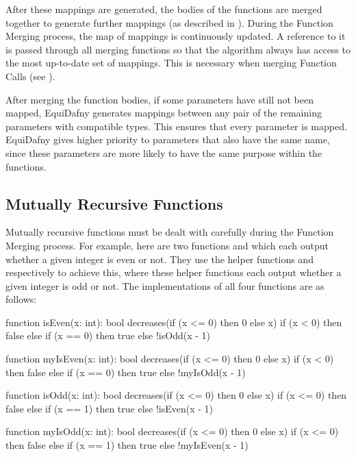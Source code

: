 After these mappings are generated, the bodies of the functions are merged together to generate further mappings (as described in ). During the Function Merging process, the map of mappings is continuously updated. A reference to it is passed through all merging functions so that the algorithm always has access to the most up-to-date set of mappings. This is necessary when merging Function Calls (see ). 

After merging the function bodies, if some parameters have still not been mapped, EquiDafny generates mappings between any pair of the remaining parameters with compatible types. This ensures that every parameter is mapped. EquiDafny gives higher priority to parameters that also have the same name, since these parameters are more likely to have the same purpose within the functions.

\subsection{Mutually Recursive Functions}\label{sec:mutually-recursive}
Mutually recursive functions must be dealt with carefully during the Function Merging process. For example, here are two functions  and  which each output whether a given integer is even or not. They use the helper functions  and  respectively to achieve this, where these helper functions each output whether a given integer is odd or not. The implementations of all four functions are as follows:

\begin{dafny}[highlightlines={5,12,19,26}]
function isEven(x: int): bool
  decreases(if (x <= 0) then 0 else x) {
  if (x < 0) then false
  else if (x == 0) then true
  else !isOdd(x - 1)
}

function myIsEven(x: int): bool
  decreases(if (x <= 0) then 0 else x) {
  if (x < 0) then false
  else if (x == 0) then true
  else !myIsOdd(x - 1)
}

function isOdd(x: int): bool
  decreases(if (x <= 0) then 0 else x) {
  if (x <= 0) then false
  else if (x == 1) then true
  else !isEven(x - 1)
}

function myIsOdd(x: int): bool
  decreases(if (x <= 0) then 0 else x) {
  if (x <= 0) then false
  else if (x == 1) then true
  else !myIsEven(x - 1)
}
\end{dafny}


